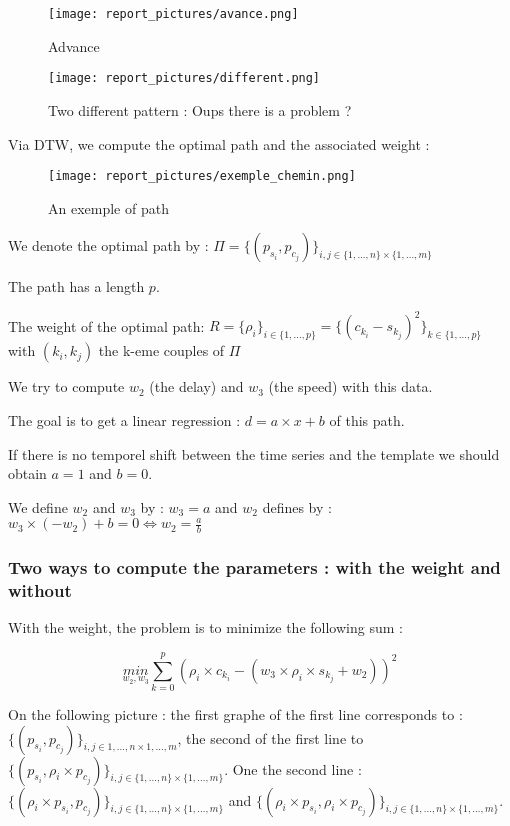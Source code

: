 \documentclass[a4,12pt]{article}
\begin{document}
	\begin{figure}[H]
		\centering
		\texttt{[image: report\_pictures/avance.png]}
		\caption{Advance}
		\label{avance}
	\end{figure}
	
	\begin{figure}[H]
		\centering
		\texttt{[image: report\_pictures/different.png]}
		\caption{Two different pattern : Oups there is a problem ?}
		\label{different}
	\end{figure}
	
	Via DTW, we compute the optimal path and the associated weight :
	
	\begin{figure}[H]
		\centering
		\texttt{[image: report\_pictures/exemple\_chemin.png]}
		\caption{An exemple of path}
		\label{ex_dist_rep}
	\end{figure}
	
	We denote the optimal path by : $\Pi = \{(p_{s_i}, p_{c_j})\}_{i,j \in \{1, ..., n\} \times \{1, ..., m\} }$
	
	The path has a length $p$.
	
	The weight of the optimal path: $R = \{ \rho_i \}_{i \in \{1, ..., p\} } = \{ (c_{k_i} - s_{k_j})^2 \}_{k \in \{1, ..., p\} }$ with $(k_i,k_j)$ the k-eme couples of $\Pi$
	
	We try to compute $w_2$ (the delay) and $w_3$ (the speed) with this data.
	
	The goal is to get a linear regression : $d = a \times x + b$ of this path. 
	
	If there is no temporel shift between the time series and the template we should obtain $a=1$ and $b=0$.
	
	We define $w_2$ and $w_3$ by : $w_3=a$ and $w_2$ defines by : $w_3 \times (-w_2) + b = 0 \Leftrightarrow w_2 = \frac{a}{b}$
	
	\subsubsection{Two ways to compute the parameters : with the weight and without}
	
	With the weight, the problem is to minimize the following sum :
	
	\[ \underset{w_2,w_3}{min} \sum_{k=0}^p ( \rho_i \times c_{k_i} - ( w_3 \times \rho_i \times s_{k_j} + w_2) )^2 \]
	
	On the following picture : the first graphe of the first line corresponds to : $\{(p_{s_i}, p_{c_j})\}_{i,j \in {1, ..., n} \times {1, ..., m} }$, the second of the first line to $\{(p_{s_i}, \rho_i \times p_{c_j})\}_{i,j \in \{1, ..., n\} \times \{1, ..., m\} }$. One the second line : $\{(\rho_i \times p_{s_i}, p_{c_j})\}_{i,j \in \{1, ..., n\} \times \{1, ..., m\} }$ and $\{(\rho_i \times p_{s_i}, \rho_i \times p_{c_j})\}_{i,j \in \{1, ..., n\} \times \{1, ..., m\} }$.
	
\end{document}
